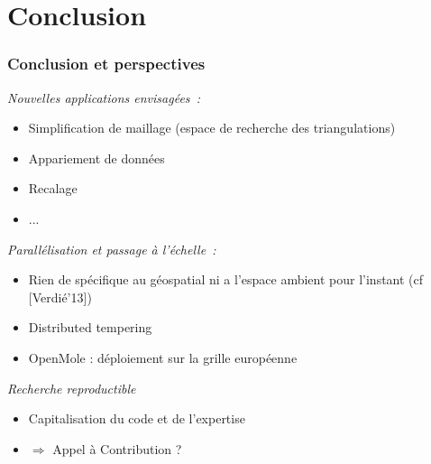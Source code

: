 \documentclass{beamer}
\begin{document}
\section{Conclusion}
\begin{frame}
\frametitle{Conclusion et perspectives}
\emph{Nouvelles applications envisagées~:} 
\begin{itemize}
\item Simplification de maillage (espace de recherche des triangulations)
\item Appariement de données
\item Recalage
\item ...
\end{itemize}

\emph{Parallélisation et passage à l'échelle~:} 
\begin{itemize}
\item Rien de spécifique au géospatial ni a l'espace ambient pour l'instant (cf [Verdié'13])
\item Distributed tempering
\item OpenMole : déploiement sur la grille européenne
\end{itemize}

\emph{Recherche reproductible}
\begin{itemize}
\item Capitalisation du code et de l'expertise
\item $\Rightarrow$ Appel à Contribution ?
\end{itemize}
\end{frame}
\end{document}
